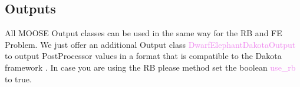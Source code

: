 \documentclass[11pt, a4paper, DIV=14]{scrartcl}
\begin{document}
\subsection{Outputs}
All MOOSE Output classes can be used in the same way for the RB and FE Problem. We just offer an additional Output class \textcolor{violet}{DwarfElephantDakotaOutput} to output PostProcessor values in a format that is compatible to the Dakota framework \cite{adams_et_al}. In case you are using the RB please method set the boolean \textcolor{violet}{use\_rb} to true.

%
%
%
\end{document}
